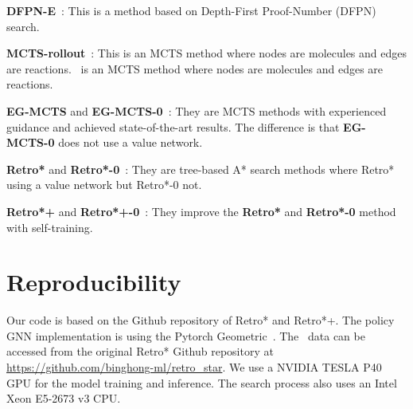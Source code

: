\documentclass[sigconf]{acmart}
\begin{document}
 \textbf{DFPN-E}~\citep{kishimoto2019depth}:  This is a  method based on Depth-First Proof-Number (DFPN) search.

 \textbf{MCTS-rollout}~\citep{Hong2021}: This is an MCTS method where nodes are molecules and edges are reactions.~\citep{Hong2021} is an MCTS method where nodes are molecules and edges are reactions.

 \textbf{EG-MCTS} and \textbf{EG-MCTS-0}~\citep{Hong2021}: They are MCTS methods with experienced guidance and achieved state-of-the-art results. The difference is that \textbf{EG-MCTS-0} does not use a value network.

 \textbf{Retro*} and \textbf{Retro*-0}~\citep{Chen2020}: They are tree-based A* search methods where Retro* using a value network but Retro*-0 not.

 \textbf{Retro*+} and \textbf{Retro*+-0}~\cite{Kim2021}: They improve the \textbf{Retro*} and \textbf{Retro*-0} method with self-training. 

\section{Reproducibility}

Our code is based on the Github repository of Retro* and Retro*+.
The policy GNN implementation is using the Pytorch Geometric~\citep{Fey/Lenssen/2019}.
The \uspto~data can be accessed from the original Retro* Github repository at \url{https://github.com/binghong-ml/retro_star}.
We use a NVIDIA TESLA P40 GPU for the model training and inference.
The search process also uses an Intel Xeon E5-2673 v3 CPU.
\end{document}
